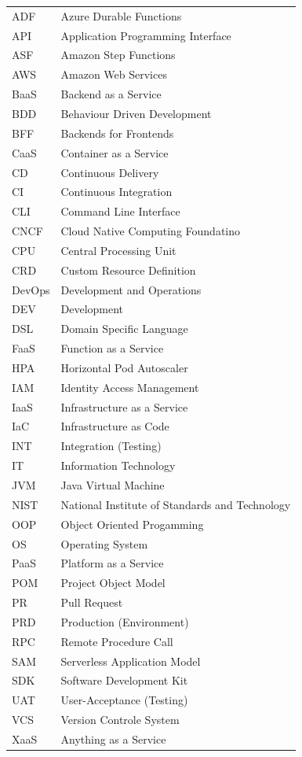 \documentclass[11pt]{article}
\begin{document}
\begin{tabular}{ p{2cm} p{10cm}} 
ADF & Azure Durable Functions \\
API & Application Programming Interface \\
ASF & Amazon Step Functions \\
AWS & Amazon Web Services \\
BaaS & Backend as a Service \\
BDD & Behaviour Driven Development \\
BFF & Backends for Frontends \\
CaaS & Container as a Service \\  
CD & Continuous Delivery \\  
CI & Continuous Integration \\
CLI & Command Line Interface \\
CNCF & Cloud Native Computing Foundatino \\
CPU & Central Processing Unit \\
CRD & Custom Resource Definition \\
DevOps & Development and Operations \\  
DEV & Development \\
DSL & Domain Specific Language \\
FaaS & Function as a Service \\ 
HPA & Horizontal Pod Autoscaler \\
IAM & Identity Access Management \\
IaaS & Infrastructure as a Service \\
IaC & Infrastructure as Code \\
INT & Integration (Testing) \\
IT & Information Technology \\
JVM & Java Virtual Machine \\
NIST & National Institute of Standards and Technology \\
OOP & Object Oriented Progamming \\
OS & Operating System \\
PaaS & Platform as a Service \\
POM & Project Object Model \\
PR & Pull Request \\
PRD & Production (Environment) \\
RPC & Remote Procedure Call \\
SAM & Serverless Application Model \\
SDK & Software Development Kit \\
UAT & User-Acceptance (Testing) \\
VCS & Version Controle System \\
XaaS & Anything as a Service \\
\end{tabular}
\newpage
\tableofcontents
\newpage
\end{document}
